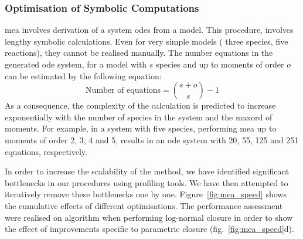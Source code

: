 \subsubsection{Optimisation of Symbolic Computations}
\label{sec:optimising_mea}

\gls{mea} involves derivation of a system \gls{ode}s from a model.
This procedure\cite{ale_general_2013}, involves lengthy symbolic calculations.
Even for very simple models (\eg{} three species, five reactions), they cannot be realised manually.
The number equations in the generated \gls{ode} system, for a model with $s$ species and up to moments of order $o$ can be estimated by the following equation: 
\begin{equation}
    \text{Number of equations} = {{s + o} \choose {s}} - 1
    \label{eq:number_of_equations}
\end{equation}
As a consequence, the complexity of the calculation is predicted to increase exponentially with the number of species in the system and the \gls{maxord} of moments. 
For example, in a system with five species, performing \gls{mea} up to moments of order 2, 3, 4 and 5, results in an \gls{ode} system with 20, 55, 125 and 251 equations, respectively. 


In order to increase the scalability of the method, we have identified significant bottlenecks in our procedures using \py{} profiling tools.
We have then attempted to iteratively remove these bottlenecks one by one. Figure~\ref{fig:mea_speed} shows the cumulative effects of different optimisations.
The performance assessment were realised on algorithm when performing log-normal closure in order to show the effect of improvements specific to parametric closure (fig.~\ref{fig:mea_speed}d). 

